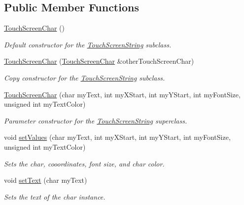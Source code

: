 \subsection*{Public Member Functions}
\begin{DoxyCompactItemize}
\item 
\hypertarget{class_touch_screen_char_a712dee575d947e58a776be559d33dc3f}{\hyperlink{class_touch_screen_char_a712dee575d947e58a776be559d33dc3f}{Touch\+Screen\+Char} ()}\label{class_touch_screen_char_a712dee575d947e58a776be559d33dc3f}

\begin{DoxyCompactList}\small\item\em Default constructor for the \hyperlink{class_touch_screen_string}{Touch\+Screen\+String} subclass. \end{DoxyCompactList}\item 
\hyperlink{class_touch_screen_char_a16271426fbf961392b6439c42c110c67}{Touch\+Screen\+Char} (\hyperlink{class_touch_screen_char}{Touch\+Screen\+Char} \&other\+Touch\+Screen\+Char)
\begin{DoxyCompactList}\small\item\em Copy constructor for the \hyperlink{class_touch_screen_string}{Touch\+Screen\+String} subclass. \end{DoxyCompactList}\item 
\hyperlink{class_touch_screen_char_a2a0a141a1d9b65b54031eea6317c2a63}{Touch\+Screen\+Char} (char my\+Text, int my\+X\+Start, int my\+Y\+Start, int my\+Font\+Size, unsigned int my\+Text\+Color)
\begin{DoxyCompactList}\small\item\em Parameter constructor for the \hyperlink{class_touch_screen_string}{Touch\+Screen\+String} superclass. \end{DoxyCompactList}\item 
void \hyperlink{class_touch_screen_char_a1cd1be7f6a6f0b7eefe198c70f799dce}{set\+Values} (char my\+Text, int my\+X\+Start, int my\+Y\+Start, int my\+Font\+Size, unsigned int my\+Text\+Color)
\begin{DoxyCompactList}\small\item\em Sets the char, cooordinates, font size, and char color. \end{DoxyCompactList}\item 
void \hyperlink{class_touch_screen_char_a3193c7b27aee874a21cdf86a39da6b61}{set\+Text} (char my\+Text)
\begin{DoxyCompactList}\small\item\em Sets the text of the char instance. \end{DoxyCompactList}\item 

\end{DoxyCompactItemize}
